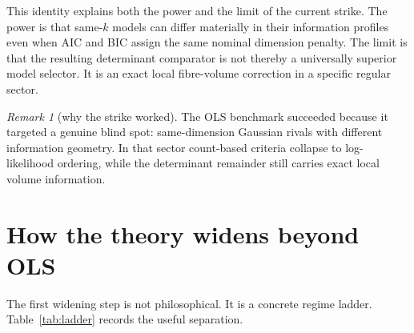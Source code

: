 \documentclass[11pt,a4paper]{article}
\numberwithin{equation}{section}
\theoremstyle{thmcompact}
\theoremstyle{remark}
\newtheorem*{remarkplain}{Remark}
\newenvironment{remark}[1][]%
{\begin{remarkbox}\begin{remarkplain}[#1]\normalfont}
{\end{remarkplain}\end{remarkbox}}
\begin{document}
This identity explains both the power and the limit of the current strike. The power is that same-$k$ models can differ materially in their information profiles even when AIC and BIC assign the same nominal dimension penalty. The limit is that the resulting determinant comparator is not thereby a universally superior model selector. It is an exact local fibre-volume correction in a specific regular sector.

\begin{remark}[why the strike worked]
The OLS benchmark succeeded because it targeted a genuine blind spot: same-dimension Gaussian rivals with different information geometry. In that sector count-based criteria collapse to log-likelihood ordering, while the determinant remainder still carries exact local volume information.
\end{remark}

\section{How the theory widens beyond OLS}

The first widening step is not philosophical. It is a concrete regime ladder. Table~\ref{tab:ladder} records the useful separation.
\end{document}
